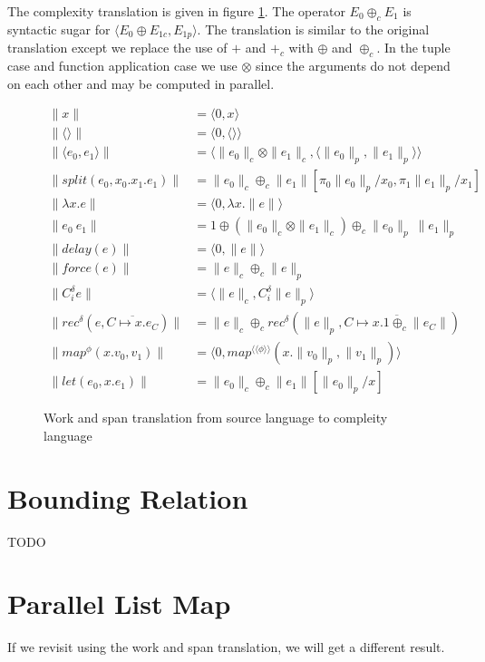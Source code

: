 The complexity translation is given in figure \ref{fig:ws_complexity_translation}.
The operator $E_0 \oplus_c E_1$ is syntactic sugar for $\langle E_0 \oplus E_{1c}, E_{1p} \rangle$.
The translation is similar to the original translation except we replace the use of $+$ and $+_c$ with $\oplus$ and $\oplus_c$.
In the tuple case and function application case we use $\otimes$ since the arguments do not depend on each other and may be computed in parallel.


\begin{figure}
  \label{fig:ws_complexity_translation}
  \caption{Work and span translation from source language to compleity language}
  \begin{align*}
    \|x\| &= \langle 0, x \rangle \\
    \|\langle\rangle\| &= \langle 0, \langle \rangle \rangle \\
    \|\langle e_0, e_1 \rangle \| &= \langle \|e_0\|_c \otimes \|e_1\|_c, \langle \|e_0\|_p, \|e_1\|_p\rangle\rangle \\
    \|split(e_0, x_0.x_1.e_1)\| &= \|e_0\|_c \oplus_c \|e_1\|[\pi_0\|e_0\|_p/x_0, \pi_1\|e_1\|_p/x_1] \\
    \|\lambda x.e\| &= \langle 0, \lambda x.\|e\| \rangle \\
    \|e_0\ e_1\| &= 1 \oplus (\|e_0\|_c \otimes \|e_1\|_c) \oplus_c \|e_0\|_p\ \|e_1\|_p \\
    \|delay(e)\| &= \langle 0, \|e\|\rangle \\
    \|force(e)\| &= \|e\|_c \oplus_c \|e\|_p \\
    \|C_i^\delta e\| &= \langle \|e\|_c, C_i^\delta \|e\|_p \rangle \\
    \|rec^\delta(e, \overline{C \mapsto x.e_C})\| &= \|e\|_c \oplus_c rec^\delta(\|e\|_p, \overline{C \mapsto x.1 \oplus_c \|e_C\|}) \\
    \|map^\phi(x.v_0, v_1)\| &= \langle 0, map^{\langle\langle \phi \rangle \rangle} (x. \|v_0\|_p, \|v_1\|_p)\rangle \\
    \|let(e_0, x.e_1)\| &= \|e_0\|_c \oplus_c \|e_1\|[\|e_0\|_p/x]
  \end{align*}
\end{figure}

\section{Bounding Relation}
TODO


\section{Parallel List Map}
If we revisit  using the work and span translation, we will get a different result.


